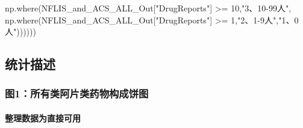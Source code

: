 \documentclass[
]{article}
\newenvironment{Shaded}{}{}
\newcommand{\DecValTok}[1]{\textcolor[rgb]{0.25,0.63,0.44}{#1}}
\newcommand{\NormalTok}[1]{#1}
\newcommand{\OperatorTok}[1]{\textcolor[rgb]{0.40,0.40,0.40}{#1}}
\newcommand{\StringTok}[1]{\textcolor[rgb]{0.25,0.44,0.63}{#1}}
\begin{document}
\begin{Shaded}
\begin{Highlighting}[]
\NormalTok{                                                                        np.where(NFLIS\_and\_ACS\_ALL\_Out[}\StringTok{"DrugReports"}\NormalTok{] }\OperatorTok{\textgreater{}=} \DecValTok{10}\NormalTok{,}\StringTok{"3、10{-}99人"}\NormalTok{,}
\NormalTok{                                                                               np.where(NFLIS\_and\_ACS\_ALL\_Out[}\StringTok{"DrugReports"}\NormalTok{] }\OperatorTok{\textgreater{}=} \DecValTok{1}\NormalTok{,}\StringTok{"2、1{-}9人"}\NormalTok{,}\StringTok{"1、0人"}\NormalTok{))))))}
\end{Highlighting}
\end{Shaded}

\hypertarget{header-n222}{%
\subsection{统计描述}\label{header-n222}}

\hypertarget{header-n223}{%
\subsubsection{图1：所有类阿片类药物构成饼图}\label{header-n223}}

\hypertarget{header-n224}{%
\paragraph{整理数据为直接可用}\label{header-n224}}
\end{document}
